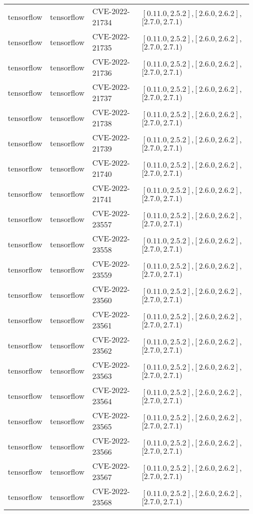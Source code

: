 \begin{tabular}{llll}
tensorflow & tensorflow & CVE-2022-21734 & $[0.11.0,2.5.2]$,$[2.6.0,2.6.2]$,$[2.7.0,2.7.1)$ \\
tensorflow & tensorflow & CVE-2022-21735 & $[0.11.0,2.5.2]$,$[2.6.0,2.6.2]$,$[2.7.0,2.7.1)$ \\
tensorflow & tensorflow & CVE-2022-21736 & $[0.11.0,2.5.2]$,$[2.6.0,2.6.2]$,$[2.7.0,2.7.1)$ \\
tensorflow & tensorflow & CVE-2022-21737 & $[0.11.0,2.5.2]$,$[2.6.0,2.6.2]$,$[2.7.0,2.7.1)$ \\
tensorflow & tensorflow & CVE-2022-21738 & $[0.11.0,2.5.2]$,$[2.6.0,2.6.2]$,$[2.7.0,2.7.1)$ \\
tensorflow & tensorflow & CVE-2022-21739 & $[0.11.0,2.5.2]$,$[2.6.0,2.6.2]$,$[2.7.0,2.7.1)$ \\
tensorflow & tensorflow & CVE-2022-21740 & $[0.11.0,2.5.2]$,$[2.6.0,2.6.2]$,$[2.7.0,2.7.1)$ \\
tensorflow & tensorflow & CVE-2022-21741 & $[0.11.0,2.5.2]$,$[2.6.0,2.6.2]$,$[2.7.0,2.7.1)$ \\
tensorflow & tensorflow & CVE-2022-23557 & $[0.11.0,2.5.2]$,$[2.6.0,2.6.2]$,$[2.7.0,2.7.1)$ \\
tensorflow & tensorflow & CVE-2022-23558 & $[0.11.0,2.5.2]$,$[2.6.0,2.6.2]$,$[2.7.0,2.7.1)$ \\
tensorflow & tensorflow & CVE-2022-23559 & $[0.11.0,2.5.2]$,$[2.6.0,2.6.2]$,$[2.7.0,2.7.1)$ \\
tensorflow & tensorflow & CVE-2022-23560 & $[0.11.0,2.5.2]$,$[2.6.0,2.6.2]$,$[2.7.0,2.7.1)$ \\
tensorflow & tensorflow & CVE-2022-23561 & $[0.11.0,2.5.2]$,$[2.6.0,2.6.2]$,$[2.7.0,2.7.1)$ \\
tensorflow & tensorflow & CVE-2022-23562 & $[0.11.0,2.5.2]$,$[2.6.0,2.6.2]$,$[2.7.0,2.7.1)$ \\
tensorflow & tensorflow & CVE-2022-23563 & $[0.11.0,2.5.2]$,$[2.6.0,2.6.2]$,$[2.7.0,2.7.1)$ \\
tensorflow & tensorflow & CVE-2022-23564 & $[0.11.0,2.5.2]$,$[2.6.0,2.6.2]$,$[2.7.0,2.7.1)$ \\
tensorflow & tensorflow & CVE-2022-23565 & $[0.11.0,2.5.2]$,$[2.6.0,2.6.2]$,$[2.7.0,2.7.1)$ \\
tensorflow & tensorflow & CVE-2022-23566 & $[0.11.0,2.5.2]$,$[2.6.0,2.6.2]$,$[2.7.0,2.7.1)$ \\
tensorflow & tensorflow & CVE-2022-23567 & $[0.11.0,2.5.2]$,$[2.6.0,2.6.2]$,$[2.7.0,2.7.1)$ \\
tensorflow & tensorflow & CVE-2022-23568 & $[0.11.0,2.5.2]$,$[2.6.0,2.6.2]$,$[2.7.0,2.7.1)$ \\

\end{tabular}
